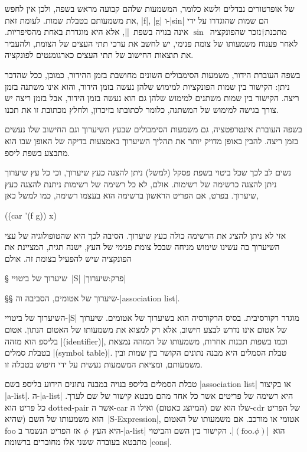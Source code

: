 של אופרטורים נבדלים ולשא כלומר, המשמעות שלהם קבועה מראש בשפה,
ולכן אין לחפש את משמעותם בטבלת שמות. לעומת זאת, \T|f|, \T|g| ו-\T|sin| הם שמות
שהוגדרו על ידי מתכנת†{נזכר שהפונקציה~$\sin$
אינה בנויה בשפת~\E|\CPL|, אלא היא מוגדרת באחת מהסיפריות.} לאחר פענוח משמעותו של
צומת פנימי, יש לחשב את ערכי תתי העצים של הצומת, ולהעביר את תוצאות החישוב של תתי
העצים כארגומנטים לפונקציה.

בשפה העוברת הידור, משמעות הסימבולים השונים מחושבת בזמן ההידור, כמובן, ככל שהדבר
ניתן: הקישור בין שמות הפונקציות למימוש שלהן נעשה בזמן הידור, והוא אינו משתנה
בזמן ריצה. הקישור בין שמות משתנים למימוש שלהן גם הוא נעשה בזמן הידור, אבל בזמן
ריצה יש צורך בגישה למימוש של המשתנה, כלומר לכתובתו בזיכרון, ולחלץ מכתובת זו את
תכנו.

בשפה העוברת אינטרפטציה, גם משמעות הסימבולים שבעץ השיערוך וגם החישוב שלו נעשים
בזמן ריצה.  להבין באופן מדויק יותר את תהליך השיערוך באמצעות
בדיקה של
האופן שבו הוא
מתבצע בשפת ליספ.

נשים לב לכך שכל ביטוי בשפת פסקל (למשל) ניתן להצגה כעץ שיערוך, וכי כל עץ שיערוך
ניתן להצגה כרשימה של רשימות. אולם, לא כל רשימה של רשימות ניתנת להצגה כעץ
שיערוך. בפרט, אם הפריט הראשון ברשימה הוא בעצמו רשימה, כמו למשל כאן,
\begin{LISP}
((car '(f g)) x)
\end{LISP}
אזי לא ניתן להציג את הרשימה כולה כעץ שיערוך. הסיבה לכך היא שהטופולוגיה של עצי
השיערוך בה עשינו שימוש מניחה שבכל צומת פנימי של העץ, ישנה תגית, המציינת את
הפונקציה שיש להפעיל בצומת זה. אולם

§ שיערוך של ביטויי~\E|S|
|פרק:שיערוך|

§§ שיערוך של אטומים, הסביבה וה-\E|association list|.

השיערוך של ביטויי-\E|S| מוגדר רקורסיבית. בסיס הרקורסיה הוא בשיערוך של אטומים.
שיערוך של אטום אינו נדרש לבצע חישוב, אלא רק למצוא את משמעותו של האטום הנתון.
אטום בליספ הוא מזהה \E|(identifier)|, וכמו בשפות תכנות אחרות, משמעותו של המזהה
נמצאת בטבלת סמלים \E|(symbol table)|. טבלת הסמלים היא מבנה נתונים הקושר בין
שמות ובין משמעותם, ומציאת המשמעות נעשית על ידי חיפוש בטבלה זו.

טבלת הסמלים בליספ בנויה במבנה נתונים הידוע בליספ בשם \E|association list|
או בקיצור \E|a-list|. ה-\E|a-list| היא רשימה של פריטים אשר כל אחד מהם מבטא
קישור של שם לערך. כל פריט הוא dotted-pair אשר ה-car שלו הוא שם (המיוצג כאטום)
ואילו ה-cdr של הפריט הוא משמעותו של השם (שהיא~\E|S-Expression|, אטומי או מורכב.
אם משמעותו של האטום foo היא העץ~$ϕ$ אז הפריט הנשמר ב-\E|a-list|
הוא~\E|$(\text{foo}.ϕ)$|. הקישור בין השם והביטוי מתבטא בעובדה ששני אלו מחוברים
ברשומת \E|cons|.

